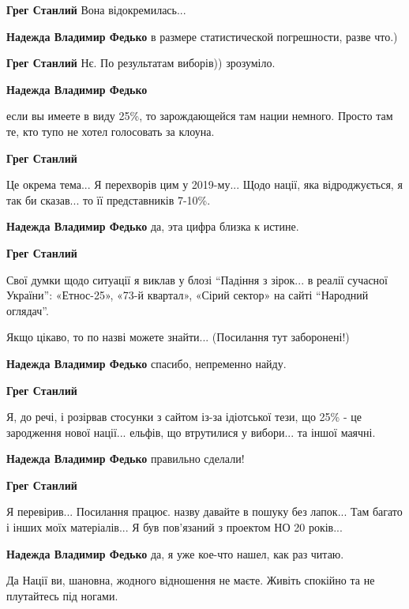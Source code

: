 \begin{itemize}
\begin{itemize}
\begin{itemize}
\textbf{Грег Станлий} Вона відокремилась...

\textbf{Надежда Владимир Федько} в размере статистической погрешности, разве что.)

\textbf{Грег Станлий} Нє. По результатам виборів)) зрозуміло.

\textbf{Надежда Владимир Федько} 

если вы имеете в виду 25\%, то зарождающейся там нации немного. Просто там те,
кто тупо не хотел голосовать за клоуна.

\textbf{Грег Станлий} 

Це окрема тема... Я перехворів цим у 2019-му... Щодо нації, яка відроджується,
я так би сказав... то її представників 7-10\%.

\textbf{Надежда Владимир Федько} да, эта цифра близка к истине.

\textbf{Грег Станлий} 

Свої думки щодо ситуації я виклав у блозі \enquote{Падіння з зірок... в реалії сучасної
України}: «Етнос-25», «73-й квартал», «Сірий сектор» на сайті \enquote{Народний
оглядач}.

Якщо цікаво, то по назві можете знайти... (Посилання тут заборонені!)

\textbf{Надежда Владимир Федько} спасибо, непременно найду.

\textbf{Грег Станлий} 

Я, до речі, і розірвав стосунки з сайтом із-за ідіотської тези, що 25\% - це
зародження нової нації... ельфів, що втрутилися у вибори... та іншої маячні.

\textbf{Надежда Владимир Федько} правильно сделали!

\textbf{Грег Станлий} 

Я перевірив... Посилання працює. назву давайте в пошуку без лапок... Там багато
і інших моїх матеріалів... Я був пов'язаний з проектом НО 20 років...

\textbf{Надежда Владимир Федько} да, я уже кое-что нашел, как раз читаю.


Да Нації ви, шановна, жодного відношення не маєте. Живіть спокійно та не плутайтесь під ногами.
\end{itemize} %


\end{itemize}
\end{itemize}
